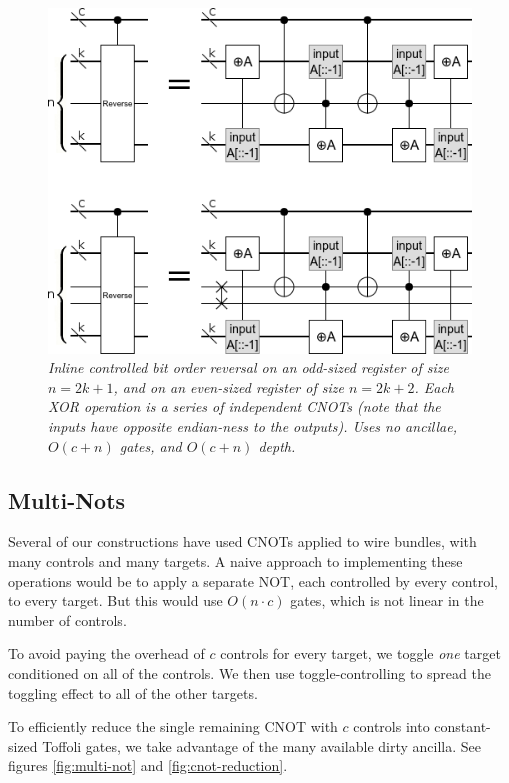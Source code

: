 \documentclass[twocolumn]{article}
\begin{document}
\begin{figure}
  \centering
  \includegraphics[width=\linewidth]{assets/controlled-reverse.png}
  \caption{\em
    Inline controlled bit order reversal on an odd-sized register of size $n=2k+1$, and on an even-sized register of size $n=2k+2$.
    Each XOR operation is a series of independent CNOTs (note that the inputs have opposite endian-ness to the outputs).
    Uses no ancillae, $O(c + n)$ gates, and $O(c + n)$ depth.
  }
  \label{fig:bit-reverse}
\end{figure}


\subsection{Multi-Nots}

Several of our constructions have used CNOTs applied to wire bundles, with many controls and many targets.
A naive approach to implementing these operations would be to apply a separate NOT, each controlled by every control, to every target.
But this would use $O(n \cdot c)$ gates, which is not linear in the number of controls.

To avoid paying the overhead of $c$ controls for every target, we toggle {\em one} target conditioned on all of the controls.
We then use toggle-controlling to spread the toggling effect to all of the other targets.

To efficiently reduce the single remaining CNOT with $c$ controls into constant-sized Toffoli gates, we take advantage of the many available dirty ancilla.
See figures \ref{fig:multi-not} and \ref{fig:cnot-reduction}.
\end{document}
